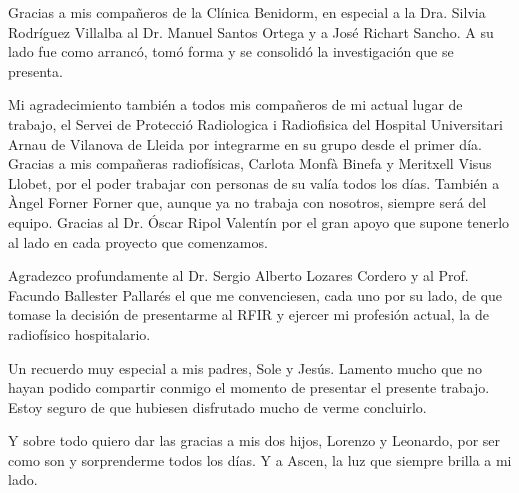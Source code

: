 Gracias a mis compañeros de la Clínica Benidorm, en especial a la Dra. Silvia Rodríguez Villalba al Dr. Manuel Santos Ortega y a José Richart Sancho. A su lado fue como arrancó, tomó forma y se consolidó la investigación que se presenta.

Mi agradecimiento también a todos mis compañeros de mi actual lugar de trabajo, el Servei de Protecció Radiologica i Radiofisica del Hospital Universitari Arnau de Vilanova de Lleida por integrarme en su grupo desde el primer día. Gracias a mis compañeras radiofísicas, Carlota Monfà Binefa y Meritxell Visus Llobet, por el poder trabajar con personas de su valía todos los días. También a Àngel Forner Forner que, aunque ya no trabaja con nosotros, siempre será del equipo. Gracias al Dr. Óscar Ripol Valentín por el gran apoyo que supone tenerlo al lado en cada proyecto que comenzamos.

Agradezco profundamente al Dr. Sergio Alberto Lozares Cordero y al Prof. Facundo Ballester Pallarés el que me convenciesen, cada uno por su lado, de que tomase la decisión de presentarme al RFIR y ejercer mi profesión actual, la de radiofísico hospitalario.

Un recuerdo muy especial a mis padres, Sole y Jesús. Lamento mucho que no hayan podido compartir conmigo el momento de presentar el presente trabajo. Estoy seguro de que hubiesen disfrutado mucho de verme concluirlo.

Y sobre todo quiero dar las gracias a mis dos hijos, Lorenzo y Leonardo, por ser como son y sorprenderme todos los días. Y a Ascen, la luz que siempre brilla a mi lado.

\newpage
\thispagestyle{empty}
\begin{flushright}
\end{flushright}